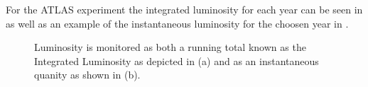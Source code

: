 For the ATLAS experiment the integrated luminosity for each year can be seen in
 as well as an example of the instantaneous luminosity for the choosen
year in .

\begin{figure}[!htbp] 
\centering
{}\hfill
{}\hfill
\caption{Luminosity is monitored as both a running total known as the Integrated
Luminosity as depicted in (a) and as an instantaneous quanity as shown in (b).}
\label{fig:luminosity} 
\end{figure}

